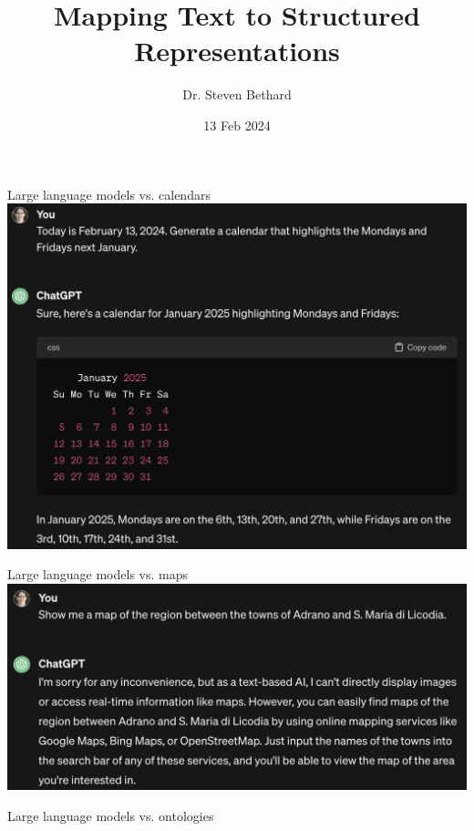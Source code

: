 \documentclass[14pt,aspectratio=169]{beamer}
\author[Bethard]{Dr. Steven Bethard}
\institute[Arizona]{%
School of Information\\
University of Arizona}
\title{Mapping Text to Structured Representations}
\date[]{13 Feb 2024}
\begin{document}
\begin{frame}
  \titlepage
\end{frame}

\begin{frame}[t]{Large language models vs. calendars}
\centering
\includegraphics[width=.6\textwidth]{chatgpt/calendar.png}
\end{frame}

\begin{frame}[t]{Large language models vs. maps}
\centering
\includegraphics[width=.7\textwidth]{chatgpt/map.png}
\end{frame}

\begin{frame}[t]{Large language models vs. ontologies}
\centering
{}
\end{frame}
\end{document}
